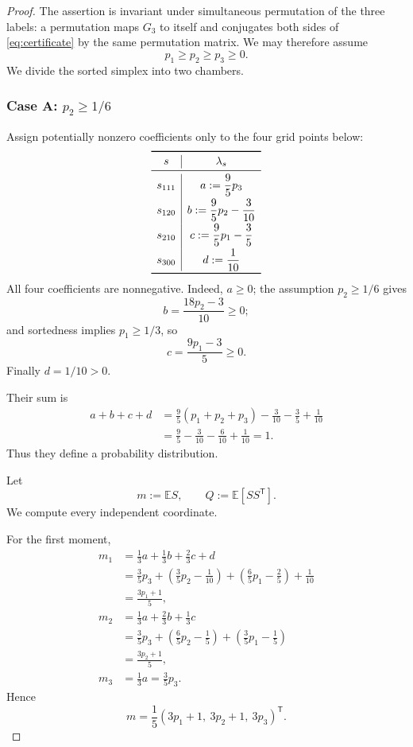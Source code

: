 \documentclass[11pt]{article}
\theoremstyle{definition}
\theoremstyle{remark}
\newcommand{\E}{\mathbb{E}}
\begin{document}
\begin{proof}
The assertion is invariant under simultaneous permutation of the three labels: a permutation maps $G_3$ to itself and conjugates both sides of \eqref{eq:certificate} by the same permutation matrix.  We may therefore assume
\begin{equation}
p_1\ge p_2\ge p_3\ge0.
\label{eq:sorted-p}
\end{equation}
We divide the sorted simplex into two chambers.

\subsubsection*{Case A: $p_2\ge1/6$}
Assign potentially nonzero coefficients only to the four grid points below:
\begin{equation}
\begin{array}{c|c}
\toprule
s&\lambda_s\\
\midrule
s_{111}&a:=\dfrac95p_3\\[2mm]
s_{120}&b:=\dfrac95p_2-\dfrac3{10}\\[2mm]
s_{210}&c:=\dfrac95p_1-\dfrac35\\[2mm]
s_{300}&d:=\dfrac1{10}\\
\bottomrule
\end{array}
\label{eq:case-A-weights}
\end{equation}
All four coefficients are nonnegative.  Indeed, $a\ge0$; the assumption $p_2\ge1/6$ gives
\[
b=\frac{18p_2-3}{10}\ge0;
\]
and sortedness implies $p_1\ge1/3$, so
\[
c=\frac{9p_1-3}{5}\ge0.
\]
Finally $d=1/10>0$.

Their sum is
\begin{align*}
a+b+c+d
&=\frac95(p_1+p_2+p_3)-\frac3{10}-\frac35+\frac1{10}\\
&=\frac95-\frac3{10}-\frac6{10}+\frac1{10}=1.
\end{align*}
Thus they define a probability distribution.

Let
\[
m:=\E S,
\qquad
Q:=\E[SS^{\mathsf T}].
\]
We compute every independent coordinate.

For the first moment,
\begin{align*}
m_1
&=\frac13a+\frac13b+\frac23c+d\\
&=\frac35p_3+\left(\frac35p_2-\frac1{10}\right)
 +\left(\frac65p_1-\frac25\right)+\frac1{10}\\
&=\frac{3p_1+1}{5},\\[3pt]
m_2
&=\frac13a+\frac23b+\frac13c\\
&=\frac35p_3+\left(\frac65p_2-\frac15\right)
 +\left(\frac35p_1-\frac15\right)\\
&=\frac{3p_2+1}{5},\\[3pt]
m_3
&=\frac13a=\frac35p_3.
\end{align*}
Hence
\begin{equation}
m=\frac15(3p_1+1,\ 3p_2+1,\ 3p_3)^{\mathsf T}.
\label{eq:case-A-m}
\end{equation}


\end{proof}
\end{document}
